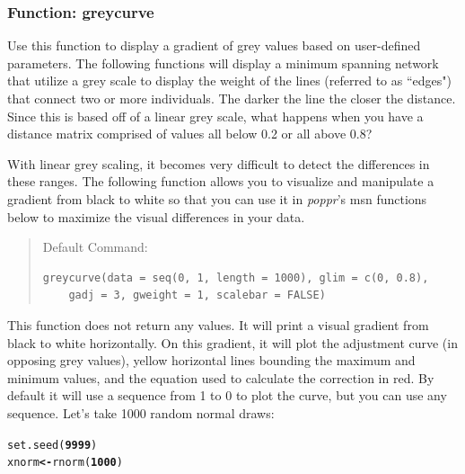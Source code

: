 \documentclass[letterpaper]{article}\usepackage[]{graphicx}\usepackage[]{color}
\makeatletter
\newcommand{\hlnum}[1]{\textcolor[rgb]{0.502,0,0.502}{\textbf{#1}}}%
\newcommand{\hlstd}[1]{\textcolor[rgb]{0,0,0}{#1}}%
\newcommand{\hlkwb}[1]{\textcolor[rgb]{0.502,0.502,0.753}{\textbf{#1}}}%
\newcommand{\hlkwd}[1]{\textcolor[rgb]{0,0.267,0.4}{#1}}%
\newenvironment{kframe}{%
 \def\at@end@of@kframe{}%
 \ifinner\ifhmode%
  \def\at@end@of@kframe{\end{minipage}}%
  \begin{minipage}{\columnwidth}%
 \fi\fi%
 \def\FrameCommand##1{\hskip\@totalleftmargin \hskip-\fboxsep
 \colorbox{shadecolor}{##1}\hskip-\fboxsep
     \hskip-\linewidth \hskip-\@totalleftmargin \hskip\columnwidth}%
 \MakeFramed {\advance\hsize-\width
   \@totalleftmargin\z@ \linewidth\hsize
   \@setminipage}}%
 {\par\unskip\endMakeFramed%
 \at@end@of@kframe}
\newenvironment{knitrout}{}{} %
\newcommand{\tab}{\hspace*{1em}}
\makeatother
\begin{document}
\subsubsection{Function: greycurve}\label{index:trees:greycurve}
\tab\tab Use this function to display a gradient of grey values based on user-defined parameters. The following functions will display a minimum spanning network that utilize a grey scale to display the weight of the lines (referred to as ``edges") that connect two or more individuals. The darker the line the closer the distance. Since this is based off of a linear grey scale, what happens when you have a distance matrix comprised of values all below 0.2 or all above 0.8? 

With linear grey scaling, it becomes very difficult to detect the differences in these ranges. The following function allows you to visualize and manipulate a gradient from black to white so that you can use it in \textit{poppr}'s msn functions below to maximize the visual differences in your data.

\begin{quote}
Default Command:
\begin{knitrout}
\color{fgcolor}\begin{kframe}
\begin{verbatim}
greycurve(data = seq(0, 1, length = 1000), glim = c(0, 0.8), 
    gadj = 3, gweight = 1, scalebar = FALSE)
\end{verbatim}
\end{kframe}
\end{knitrout}

\end{quote}


This function does not return any values. It will print a visual gradient from black to white horizontally. On this gradient, it will plot the adjustment curve (in opposing grey values), yellow horizontal lines bounding the maximum and minimum values, and the equation used to calculate the correction in red. By default it will use a sequence from 1 to 0 to plot the curve, but you can use
any sequence. Let's take 1000 random normal draws:

\begin{knitrout}\footnotesize
{}\color{fgcolor}\begin{kframe}
\begin{alltt}
\hlkwd{set.seed}\hlstd{(}\hlnum{9999}\hlstd{)}
\hlstd{xnorm} \hlkwb{<-} \hlkwd{rnorm}\hlstd{(}\hlnum{1000}\hlstd{)}
\end{alltt}
\end{kframe}
\end{knitrout}
\end{document}

